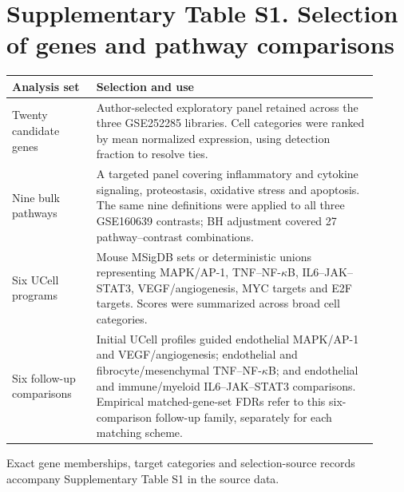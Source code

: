\section*{Supplementary Table S1. Selection of genes and pathway comparisons}
\noindent\begin{tabular}{p{0.21\linewidth}p{0.70\linewidth}}
\raggedright\textbf{Analysis set} & \raggedright\textbf{Selection and use} \tabularnewline
\hline
\raggedright Twenty candidate genes & \raggedright Author-selected exploratory panel retained across the three GSE252285 libraries. Cell categories were ranked by mean normalized expression, using detection fraction to resolve ties. \tabularnewline[7pt]
\raggedright Nine bulk pathways & \raggedright A targeted panel covering inflammatory and cytokine signaling, proteostasis, oxidative stress and apoptosis. The same nine definitions were applied to all three GSE160639 contrasts; BH adjustment covered 27 pathway--contrast combinations. \tabularnewline[7pt]
\raggedright Six UCell programs & \raggedright Mouse MSigDB sets or deterministic unions representing MAPK/AP-1, TNF--NF-\(\kappa\)B, IL6--JAK--STAT3, VEGF/angiogenesis, MYC targets and E2F targets. Scores were summarized across broad cell categories. \tabularnewline[7pt]
\raggedright Six follow-up comparisons & \raggedright Initial UCell profiles guided endothelial MAPK/AP-1 and VEGF/angiogenesis; endothelial and fibrocyte/mesenchymal TNF--NF-\(\kappa\)B; and endothelial and immune/myeloid IL6--JAK--STAT3 comparisons. Empirical matched-gene-set FDRs refer to this six-comparison follow-up family, separately for each matching scheme. \tabularnewline
\hline
\end{tabular}
\par\vspace{14pt}\noindent Exact gene memberships, target categories and selection-source records accompany Supplementary Table S1 in the source data.

